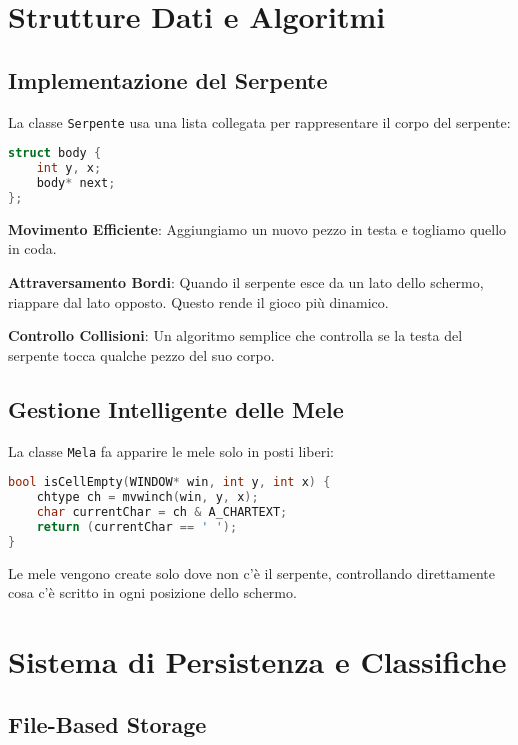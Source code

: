 \documentclass[a4paper,12pt]{article}
\begin{document}
\section{Strutture Dati e Algoritmi}

\subsection{Implementazione del Serpente}

La classe \texttt{Serpente} usa una lista collegata per rappresentare il corpo del serpente:

\begin{lstlisting}[language=C++]
struct body {
    int y, x;
    body* next;
};
\end{lstlisting}

\textbf{Movimento Efficiente}: Aggiungiamo un nuovo pezzo in testa e togliamo quello in coda.

\textbf{Attraversamento Bordi}: Quando il serpente esce da un lato dello schermo, riappare dal lato opposto. Questo rende il gioco più dinamico.

\textbf{Controllo Collisioni}: Un algoritmo semplice che controlla se la testa del serpente tocca qualche pezzo del suo corpo.

\subsection{Gestione Intelligente delle Mele}

La classe \texttt{Mela} fa apparire le mele solo in posti liberi:

\begin{lstlisting}[language=C++]
bool isCellEmpty(WINDOW* win, int y, int x) {
    chtype ch = mvwinch(win, y, x);
    char currentChar = ch & A_CHARTEXT;
    return (currentChar == ' ');
}
\end{lstlisting}

Le mele vengono create solo dove non c'è il serpente, controllando direttamente cosa c'è scritto in ogni posizione dello schermo.

\section{Sistema di Persistenza e Classifiche}

\subsection{File-Based Storage}
\end{document}
